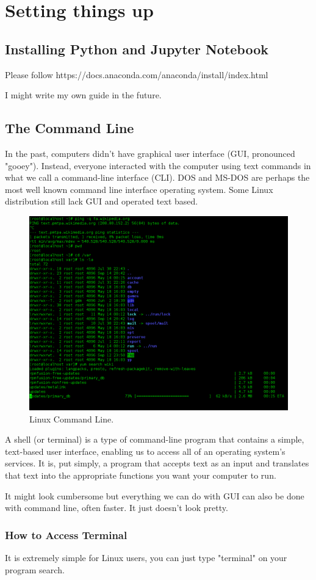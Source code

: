 \chapter{Setting things up}
\section{Installing Python and Jupyter Notebook}
Please follow https://docs.anaconda.com/anaconda/install/index.html

\noindent I might write my own guide in the future.
\section{The Command Line}
In the past, computers didn't have graphical user interface (GUI, pronounced "gooey"). Instead, everyone interacted with the computer using text commands in what we call a command-line interface (CLI). DOS and MS-DOS are perhaps the most well known command line interface operating system. Some Linux distribution still lack GUI and operated text based.
\begin{figure}[ht]
	\centering
	\includegraphics[width=0.5\linewidth]{Assets/Images/Linux_command-line._Bash._GNOME_Terminal._screenshot}
	\caption{Linux Command Line.}
	\label{fig:linuxcommand-line}
\end{figure}

\noindent A shell (or terminal) is a type of command-line program that contains a simple, text-based user interface, enabling us to access all of an operating system's services. It is, put simply, a program that accepts text as an input and translates that text into the appropriate functions you want your computer to run.

\noindent It might look cumbersome but everything we can do with GUI can also be done with command line, often faster. It just doesn't look pretty.
\subsection{How to Access Terminal}
It is extremely simple for Linux users, you can just type "terminal" on your program search.

